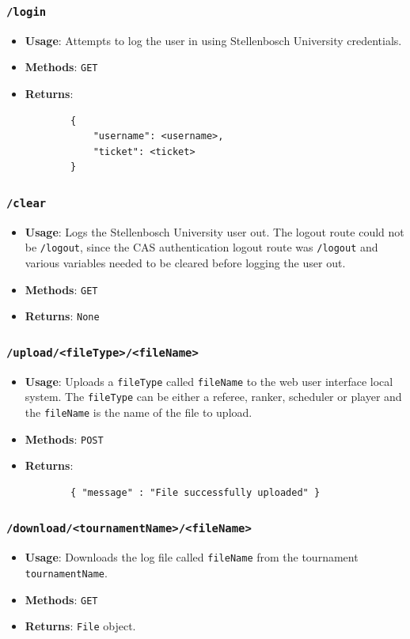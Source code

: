 \documentclass[a4paper, 12pt]{report}
\begin{document}
\subsubsection*{\texttt{/login}}
\begin{itemize}
	\item \textbf{Usage}: Attempts to log the user in using Stellenbosch
	University credentials.
	\item \textbf{Methods}: \texttt{GET}
	\item \textbf{Returns}:
	\begin{verbatim}
		{
		    "username": <username>,
		    "ticket": <ticket>
		}
	\end{verbatim}
\end{itemize}
\subsubsection*{\texttt{/clear}}
\begin{itemize}
	\item \textbf{Usage}: Logs the Stellenbosch University user out. The logout
	route could not be \texttt{/logout}, since the CAS authentication logout route
	was \texttt{/logout} and various variables needed to be cleared before logging
	the user out.
	\item \textbf{Methods}: \texttt{GET}
	\item \textbf{Returns}: \texttt{None}
\end{itemize}
\subsubsection*{\texttt{/upload/<fileType>/<fileName>}}
\begin{itemize}
	\item \textbf{Usage}: Uploads a \texttt{fileType} called \texttt{fileName}
	to the web user interface local system. The \texttt{fileType} can be either
	a referee, ranker, scheduler or player and the \texttt{fileName} is the name
	of the file to upload.
	\item \textbf{Methods}: \texttt{POST}
	\item \textbf{Returns}:
	\begin{verbatim}
		{ "message" : "File successfully uploaded" }
	\end{verbatim}
\end{itemize}
\subsubsection*{\texttt{/download/<tournamentName>/<fileName>}}
\begin{itemize}
	\item \textbf{Usage}: Downloads the log file called \texttt{fileName} from
	the tournament \texttt{tournamentName}.
	\item \textbf{Methods}: \texttt{GET}
	\item \textbf{Returns}: \texttt{File} object.
\end{itemize}
\end{document}
